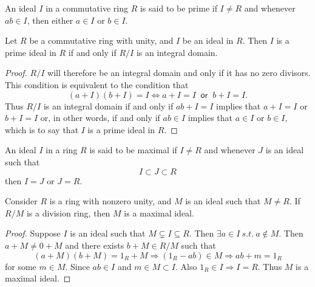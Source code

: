 \begin{definition}
    An ideal $I$ in a commutative ring $R$ is said to be prime if $I \neq R$ and whenever 
    $ab \in I$, then either $a \in I$ or $b \in I$.
\end{definition}

\begin{lemma}
    Let $R$ be a commutative ring with unity, and $I$ be an ideal in $R$. Then $I$ is 
    a prime ideal in $R$ if and only if $R/I$ is an integral domain.
\end{lemma}
\begin{proof}
    $R/I$ will therefore be an integral domain and only if it has no zero divisors. This condition 
    is equivalent to the condition that 
    \[
        (a+I)(b+I) = I \iff a + I = I \> \textsf{ or } \> b + I = I.
    \]
    Thus $R/I$ is an integral domain if and only if $ab + I = I$ implies that 
    $a + I = I$ or $b+I = I$ or, in other words, if and only if 
    $ab \in I$ implies that $a \in I$ or $b \in I$, which is to say that $I$ is a prime ideal 
    in $R$. 
\end{proof}

\begin{definition}
    An ideal $I$ in a ring $R$ is said to be maximal if $I \neq R$ and whenever $J$ is an ideal such that
    \[
        I \subset J \subset R
    \]
    then $I = J$ or $J = R$.
\end{definition}

\begin{lemma}
    Consider $R$ is a ring with nonzero unity, and $M$ is an ideal such that $M \neq R$. If $R/M$ is a 
    division ring, then $M$ is a maximal ideal.
\end{lemma}
\begin{proof}
    Suppose $I$ is an ideal such that $M \subsetneq I \subseteq R$. Then $\exists a \in I \> s.t. \> a \notin M$. 
    Then $a + M \neq 0 + M$ and there exists $b + M \in R/M$ such that 
    \[
        (a+M)(b+M) = 1_R + M \Longrightarrow (1_R - ab) \in M \Longrightarrow ab+m = 1_R
    \]
    for some $m \in M$. Since $ab \in I$ and $m \in M \subset I$. Also $1_R \in I \Longrightarrow I = R$. Thus $M$ is 
    a maximal ideal.
\end{proof}


